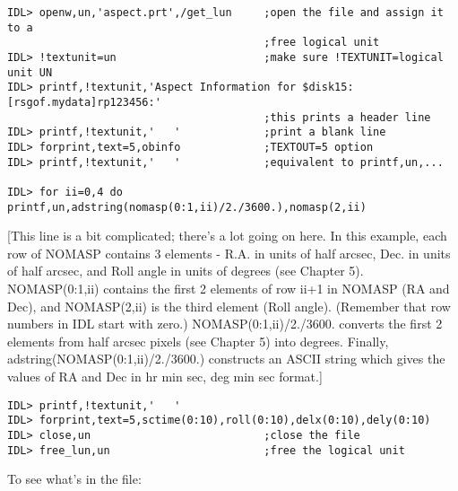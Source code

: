 \medskip\noindent
\begin{verbatim}
IDL> openw,un,'aspect.prt',/get_lun     ;open the file and assign it to a
                                        ;free logical unit
IDL> !textunit=un                       ;make sure !TEXTUNIT=logical unit UN
IDL> printf,!textunit,'Aspect Information for $disk15:[rsgof.mydata]rp123456:'
                                        ;this prints a header line
IDL> printf,!textunit,'   '             ;print a blank line
IDL> forprint,text=5,obinfo             ;TEXTOUT=5 option
IDL> printf,!textunit,'   '             ;equivalent to printf,un,...
 
IDL> for ii=0,4 do printf,un,adstring(nomasp(0:1,ii)/2./3600.),nomasp(2,ii)
\end{verbatim}
[This line is a bit complicated; there's a lot going on here. In this example,
each row of NOMASP contains 3 elements - R.A. in units of half arcsec, Dec. in
units of half arcsec, and Roll angle in units of degrees (see Chapter 5).
NOMASP(0:1,ii) contains the first 2 elements of row ii+1 in NOMASP (RA and
Dec), and NOMASP(2,ii) is the third element (Roll angle). (Remember that row
numbers in IDL start with zero.) NOMASP(0:1,ii)/2./3600. converts the first 2
elements from half arcsec pixels (see Chapter 5) into degrees. Finally,
adstring(NOMASP(0:1,ii)/2./3600.) constructs an ASCII string which gives the
values of RA and Dec in hr min sec, deg min sec format.]

\medskip\noindent
\begin{verbatim}
IDL> printf,!textunit,'   '
IDL> forprint,text=5,sctime(0:10),roll(0:10),delx(0:10),dely(0:10)
IDL> close,un                           ;close the file
IDL> free_lun,un                        ;free the logical unit
\end{verbatim}
To see what's in the file:

